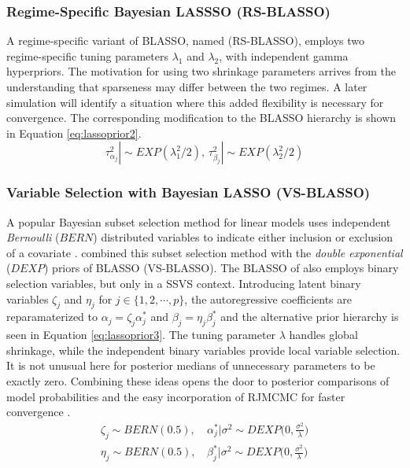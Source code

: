 \subsubsection{Regime-Specific Bayesian LASSSO (RS-BLASSO)}
A regime-specific variant of BLASSO, named (RS-BLASSO), employs two regime-specific tuning parameters $\lambda_1$ and $\lambda_2$, with independent gamma hyperpriors. The motivation for using two shrinkage parameters arrives from the understanding that sparseness may differ between the two regimes. A later simulation will identify a situation where this added flexibility is necessary for convergence. The corresponding modification to the BLASSO hierarchy is shown in Equation \ref{eq:lassoprior2}. 
\begin{equation}
	\label{eq:lassoprior2}
	 \tau^2_{\alpha_j}| \sim EXP(\lambda_1^2/2) \textrm{,  } \tau^2_{\beta_j}| \sim EXP(\lambda_2^2/2)
\end{equation}

 \subsubsection{Variable Selection with Bayesian LASSO (VS-BLASSO)}
A popular Bayesian subset selection method for linear models uses independent \textit{Bernoulli} ($BERN$) distributed variables to indicate either inclusion or exclusion of a covariate \citep{Kuo1998}. \cite{Lykou2013} combined this subset selection method with the \textit{double exponential} ($DEXP$) priors of BLASSO (VS-BLASSO). The BLASSO of \cite{Yuan2005} also employs binary selection variables, but only in a SSVS context. Introducing latent binary variables $\zeta_j$ and $\eta_j$ for $j \in \{1,2,\cdots, p\}$, the autoregressive coefficients are reparamaterized to $\alpha_j=\zeta_j\alpha_j^*$ and $\beta_j=\eta_j\beta_j^*$ and the alternative prior hierarchy is seen in  Equation \ref{eq:lassoprior3}. The tuning parameter $\lambda$ handles global shrinkage, while the independent binary variables provide local variable selection. It is not unusual here for posterior medians of unnecessary parameters to be exactly zero. Combining these ideas opens the door to posterior comparisons of model probabilities and the easy incorporation of RJMCMC for faster convergence \citep{Dellaportas2002}.
\begin{equation}
\begin{split}
	\label{eq:lassoprior3}
	 \zeta_j \sim BERN(0.5) \textrm{,  } & \alpha_j^*|\sigma^2\sim DEXP\Big(0,\frac{\sigma^2}{\lambda}\Big) \\
	  \eta_j \sim BERN(0.5) \textrm{,  } & \beta_j^*|\sigma^2\sim DEXP\Big(0,\frac{\sigma^2}{\lambda}\Big)
\end{split}
\end{equation}

